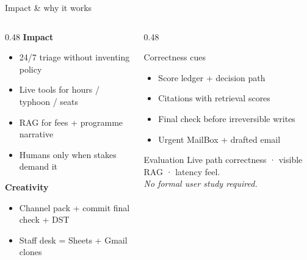 \documentclass{beamer}
\begin{document}
\begin{frame}{Impact \& why it works}{\thesection}
  \begin{columns}[T]
    \begin{column}{0.48\textwidth}
      \textbf{Impact}
      \begin{itemize}\setlength\itemsep{0.22em}
        \item 24/7 triage without inventing policy
        \item Live tools for hours / typhoon / seats
        \item RAG for fees + programme narrative
        \item Humans only when stakes demand it
      \end{itemize}
      \vspace{0.4em}
      \textbf{Creativity}
      \begin{itemize}\setlength\itemsep{0.22em}
        \item Channel pack + commit final check + DST
        \item Staff desk = Sheets + Gmail clones
      \end{itemize}
    \end{column}
    \begin{column}{0.48\textwidth}
      \begin{block}{Correctness cues}
        \begin{itemize}\setlength\itemsep{0.18em}
          \item Score ledger + decision path
          \item Citations with retrieval scores
          \item Final check before irreversible writes
          \item Urgent MailBox + drafted email
        \end{itemize}
      \end{block}
      \vspace{0.4em}
      \begin{block}{Evaluation}
        Live path correctness · visible RAG · latency feel.\\[0.15em]
        {\scriptsize\textit{No formal user study required.}}
      \end{block}
    \end{column}
  \end{columns}
\end{frame}
\end{document}
